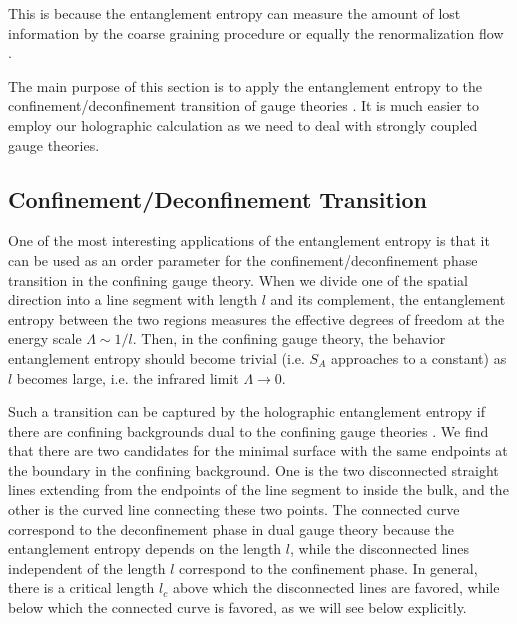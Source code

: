\documentclass[12pt]{article}
\begin{document}
This is because the entanglement entropy can measure the amount of lost information
by the coarse graining procedure or equally the renormalization flow \cite{Vidal03,Gaite,Orus05}.

The main purpose of this section is to apply the entanglement
entropy to the confinement/deconfinement transition of gauge theories
\cite{Nishioka:2006gr,Klebanov:2007ws,Faraggi:2007fu,Bah:2008cj}.
It is much easier to employ our holographic calculation as we need to
deal with strongly
coupled gauge theories.



\subsection{Confinement/Deconfinement Transition}\hspace{5mm}
One of the most interesting applications of the entanglement entropy is that
it can be used as an order parameter for the confinement/deconfinement phase
transition in the confining gauge theory. When we divide one of the spatial direction
into a line segment with length $l$ and its complement, the entanglement entropy
between the two regions measures the effective degrees of freedom at the energy scale
$\Lambda \sim 1/l$. Then, in the confining gauge theory, the behavior entanglement entropy
should become trivial (i.e. $S_A$ approaches to a constant) as $l$ becomes large, i.e. the infrared
limit $\Lambda\to 0$.

Such a transition can be captured by the holographic entanglement entropy if there
are confining backgrounds dual to the confining gauge theories
\cite{Nishioka:2006gr,Klebanov:2007ws}. We find that there are two candidates for
the minimal surface with the same endpoints at the boundary in the confining background.
One is the two disconnected straight lines extending from the endpoints of the line segment
to inside the bulk, and the other is the curved line connecting these two points.
The connected curve correspond to the deconfinement phase in dual gauge theory because
the entanglement entropy depends on the length $l$, while
the disconnected lines independent of the length $l$ correspond to the confinement
phase.
In general, there is a critical length $l_c$ above which the disconnected lines are favored,
while below which the connected curve is favored, as we will see below explicitly.
\end{document}
